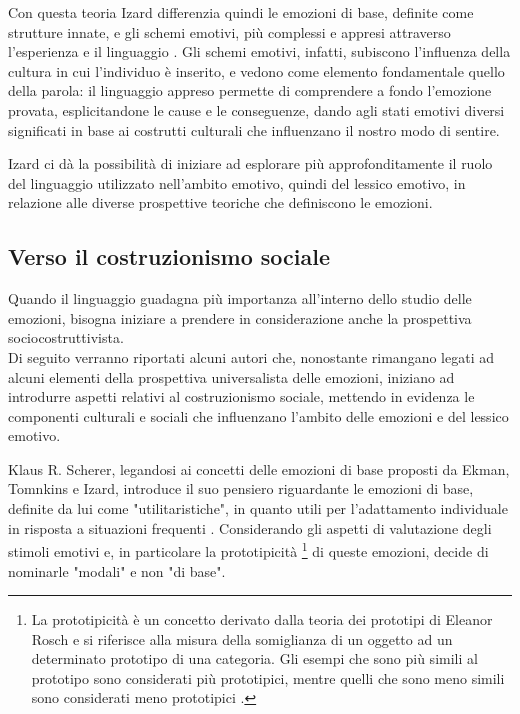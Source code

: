 Con questa teoria Izard differenzia quindi le emozioni di base, definite come strutture innate, e gli schemi emotivi, più complessi e appresi attraverso l'esperienza e il linguaggio \parencite{izard_schemi_emotivi}. Gli schemi emotivi, infatti, subiscono l'influenza della cultura in cui l'individuo è inserito, e vedono come elemento fondamentale quello della parola: il linguaggio appreso permette di comprendere a fondo l'emozione provata, esplicitandone le cause e le conseguenze, dando agli stati emotivi diversi significati in base ai costrutti culturali che influenzano il nostro modo di sentire.

Izard ci dà la possibilità di iniziare ad esplorare più approfonditamente il ruolo del linguaggio utilizzato nell'ambito emotivo, quindi del lessico emotivo, in relazione alle diverse prospettive teoriche che definiscono le emozioni.

\subsection{Verso il costruzionismo sociale}
Quando il linguaggio guadagna più importanza all'interno dello studio delle emozioni, bisogna iniziare a prendere in considerazione anche la prospettiva sociocostruttivista.\\
Di seguito verranno riportati alcuni autori che, nonostante rimangano legati ad alcuni elementi della prospettiva universalista delle emozioni, iniziano ad introdurre aspetti relativi al costruzionismo sociale, mettendo in evidenza le componenti culturali e sociali che influenzano l'ambito delle emozioni e del lessico emotivo.

Klaus R. Scherer, legandosi ai concetti delle emozioni di base proposti da Ekman, Tomnkins e Izard, introduce il suo pensiero riguardante le emozioni di base, definite da lui come "utilitaristiche", in quanto utili per l'adattamento individuale in risposta a situazioni frequenti \parencite{scherer_ekman}. Considerando gli aspetti di valutazione degli stimoli emotivi e, in particolare la prototipicità \footnote{La prototipicità è un concetto derivato dalla teoria dei prototipi di Eleanor Rosch e si riferisce alla misura della somiglianza di un oggetto ad un determinato prototipo di una categoria. Gli esempi che sono più simili al prototipo sono considerati più prototipici, mentre quelli che sono meno simili sono considerati meno prototipici \parencite{prototipicità}.} di queste emozioni, decide di nominarle "modali" e non "di base". 

